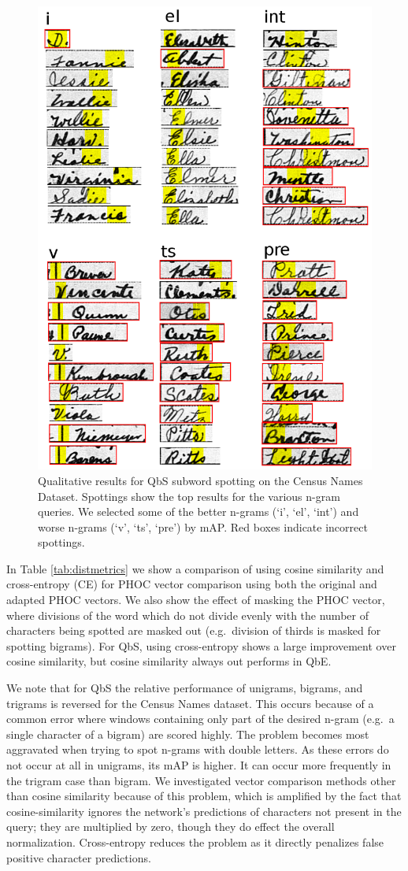 \documentclass[ms,electronic,twosidetoc,letterpaper,chaptercenter,parttop,lof,lot]{byumsphd}
\begin{document}
\begin{figure}
    \centering
    \includegraphics[width=.6\textwidth]{qualSpotNames}
    \caption{Qualitative results for QbS subword spotting on the Census Names Dataset. Spottings show the top results for the various n-gram queries. We selected some of the better n-grams (`i', `el', `int') and worse n-grams (`v', `ts', `pre') by mAP. Red boxes indicate incorrect spottings.
    }
    \label{fig:qualSpotNames}
\end{figure}

In Table \ref{tab:distmetrics} we show a comparison of using cosine similarity and cross-entropy (CE) for PHOC vector comparison using both the original and adapted PHOC vectors. We also show the effect of masking the PHOC vector, where divisions of the word which do not divide evenly with the number of characters being spotted are masked out (e.g.~division of thirds is masked for spotting bigrams). For QbS, using cross-entropy shows a large improvement over cosine similarity, but cosine similarity always out performs in QbE.

We note that for QbS the relative performance of unigrams, bigrams, and trigrams is reversed for the Census Names dataset. This occurs because of a common error where windows containing only part of the desired n-gram (e.g.~a single character of a bigram) are scored highly. %
The problem becomes most aggravated  when trying to spot n-grams with double letters. As these errors do not occur at all in unigrams, its mAP is higher. It can occur more frequently in the trigram case than bigram.
We investigated vector comparison methods other than cosine similarity because of this problem, which is amplified by the fact that cosine-similarity ignores the network's predictions of characters not present in the query; they are multiplied by zero, though they do effect the overall normalization. Cross-entropy reduces the problem as it directly penalizes false positive character predictions.
\end{document}
